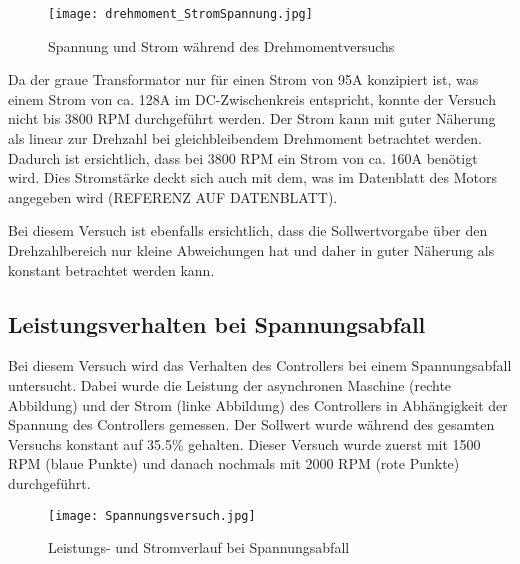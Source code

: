 \begin{figure}[H]
	\centering
	\texttt{[image: drehmoment\_StromSpannung.jpg]}
	\caption{Spannung und Strom während des Drehmomentversuchs}\label{fig:drehmoment/StromSpannung}
\end{figure}

Da der graue Transformator nur für einen Strom von 95A konzipiert ist, was einem Strom von ca. 128A im DC-Zwischenkreis entspricht, konnte der Versuch nicht bis 3800 RPM durchgeführt werden. Der Strom kann mit guter Näherung als linear zur Drehzahl bei gleichbleibendem Drehmoment betrachtet werden. Dadurch ist ersichtlich, dass bei 3800 RPM ein Strom von ca. 160A benötigt wird. Dies Stromstärke deckt sich auch mit dem, was im Datenblatt des Motors angegeben wird (REFERENZ AUF DATENBLATT).

Bei diesem Versuch ist ebenfalls ersichtlich, dass die Sollwertvorgabe über den Drehzahlbereich nur kleine Abweichungen hat und daher in guter Näherung als konstant betrachtet werden kann.


\subsection{Leistungsverhalten bei Spannungsabfall}
Bei diesem Versuch wird das Verhalten des Controllers bei einem Spannungsabfall untersucht. Dabei wurde die Leistung der asynchronen Maschine (rechte Abbildung) und der Strom (linke Abbildung) des Controllers in Abhängigkeit der Spannung des Controllers gemessen. Der Sollwert wurde während des gesamten Versuchs konstant auf 35.5\% gehalten. Dieser Versuch wurde zuerst mit 1500 RPM (blaue Punkte) und danach nochmals mit 2000 RPM (rote Punkte) durchgeführt.

\begin{figure}[H]
	\centering
	\texttt{[image: Spannungsversuch.jpg]}
	\caption{Leistungs- und Stromverlauf bei Spannungsabfall}\label{fig:Spannungsabfall}
\end{figure}
